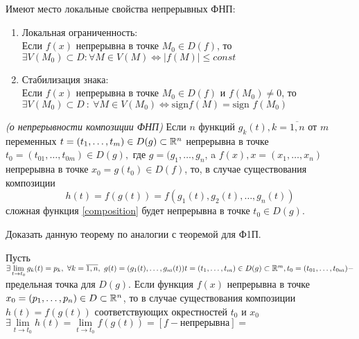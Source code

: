 \documentclass[../../main.tex]{subfiles}
\begin{document}
    Имеют место локальные свойства непрерывных ФНП:
    \begin{enumerate}
    	\item Локальная ограниченность: \\
    	Если $f(x)$ непрерывна в точке $M_0 \in D(f)$, то $\exists V(M_0)
    	\subset D : \forall M \in V(M) \iff |f(M)| \leq const$
    	\item Стабилизация знака: \\
    	Если $f(x)$ непрерывна в точке $M_0 \in D(f)$ и $f(M_0) \ne 0$, то 
       $\exists V(M_0) \subset D \ : \ \forall M \in V(M_0) \iff \text{sign}f(M)
    	= \text{sign }f(M_0)$
    \end{enumerate}
    \begin{thm}
    	\emph{(о непрерывности композиции ФНП)} Если $n$ функций $g_k(t), k = 
    	\overline{1,n}$ от $m$ переменных $t = (t_1, \ldots, t_m) \in D(g) 
    	\subset \mathbb{R}^n$ непрерывна в точке $t_0 = \left( t_{01}, \ldots, t_{0m} 
    	\right) \in D(g),$ где $g = (g_1, \ldots, g_n$, a $f(x), 
    	x = (x_1, \ldots, x_n)$ непрерывна в точке $x_0 = g(t_0) \in D(f)$,
    	то, в случае существования композиции 
    	\begin{equation}
    	\label{composition}
    		h(t) = f(g(t)) = f(g_1(t), g_2(t), \ldots, g_n(t))
    	\end{equation}
        сложная функция \eqref{composition} будет непрерывна в точке 
        $t_0 \in D(g)$.
    \end{thm}
    \begin{exc}
    	Доказать данную теорему по аналогии с теоремой для Ф1П.
    \end{exc}
    \begin{crl*}
    	Пусть $\exists \lim\limits_{t \to t_0}g_k(t) = p_k, \ 
    	\forall k = \overline{1, n}, \  g(t) = (g_1(t), \ldots, g_m(t)) t = (t_1,
    	 \ldots, t_m) \in D(g) \subset \R^m, t_0 = (t_{01}, \ldots, t_{0m}) - $
    	предельная точка для $D(g)$. Если функция $f(x)$ непрерывна в точке 
    	$x_0 = (p_1, \ldots, p_n) \in D \subset \mathbb{R}^n$, то в случае 
    	существования композиции $h(t) = f(g(t))$ соответствующих окрестностей
    	$t_0$ и $x_0$ 
    	$\exists \lim\limits_{t \to t_0}h(t) = \lim\limits_{t \to t_0}f(g(t)) =
    	\left[f - \text{непрерывна}\right] = $
    \end{crl*}
	
\end{document}
